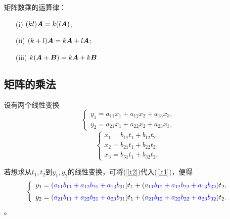 \begin{frame}
矩阵数乘的运算律：
\begin{itemize}
\item[(i)] $(k l)\boldsymbol{A} =  k(l \boldsymbol{A})$;
\item[(ii)] $(k + l) \boldsymbol{A}  = k \boldsymbol{A} + l \boldsymbol{A}$;
\item[(iii)] $k (\boldsymbol{A} + \boldsymbol{B})  = k \boldsymbol{A} + k \boldsymbol{B}$
\end{itemize}
\end{frame}

\subsection{矩阵的乘法}
\begin{frame}

设有两个线性变换
\begin{equation}\label{lt1}
  \left\{
    \begin{array}{l}
      y_1 = a_{11} x_1 + a_{12} x_2 + a_{13} x_3, \\[0.2cm]
      y_2 = a_{21} x_1 + a_{22} x_2 + a_{23} x_3,
    \end{array}
  \right.
\end{equation}
\begin{equation}\label{lt2}
  \left\{
    \begin{array}{l}
      x_1 = b_{11} t_1 + b_{12} t_2 , \\[0.2cm]
      x_2 = b_{21} t_1 + b_{22} t_2 , \\[0.2cm]
      x_3 = b_{31} t_1 + b_{32} t_2 , 
    \end{array}
  \right.
\end{equation}\pause 

若想求从$t_1, t_2$到$y_1, y_2$的线性变换，可将(\ref{lt2})代入(\ref{lt1})，便得
\begin{equation}\label{lt3}
  \left\{
    \begin{array}{l}
      y_1 = (\textcolor{blue}{a_{11}b_{11} + a_{12}b_{21} + a_{13}b_{31}}) t_1 + (\textcolor{blue}{a_{11}b_{12} + a_{12}b_{22} + a_{13}b_{32}})t_2, \\[0.2cm]
      y_2 = (\textcolor{blue}{a_{21}b_{11} + a_{22}b_{21} + a_{23}b_{31}}) t_1 + (\textcolor{blue}{a_{21}b_{12} + a_{22}b_{22} + a_{23}b_{32}})t_2.
    \end{array}
  \right.
\end{equation}
。
\end{frame}

